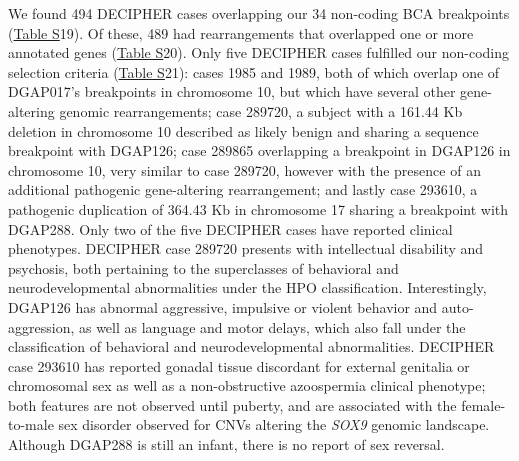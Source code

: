 \documentclass[a4paper,twoside=true,openright,parskip=full,chapterprefix=true,11pt,headings=normal,bibliography=totoc,listof=totoc,titlepage=on,captions=tableabove,draft=false]{scrreprt}
\theoremstyle{definition}
\theoremstyle{definition}
\theoremstyle{definition}
\theoremstyle{remark}
\begin{document}
We found 494 DECIPHER cases overlapping our 34 non-coding BCA
breakpoints (\protect\hyperlink{position-effect-sub-tab}{Table S}19). Of
these, 489 had rearrangements that overlapped one or more annotated
genes (\protect\hyperlink{position-effect-sub-tab}{Table S}20). Only
five DECIPHER cases fulfilled our non-coding selection criteria
(\protect\hyperlink{position-effect-sub-tab}{Table S}21): cases 1985 and
1989, both of which overlap one of DGAP017's breakpoints in chromosome
10, but which have several other gene-altering genomic rearrangements;
case 289720, a subject with a 161.44 Kb deletion in chromosome 10
described as likely benign and sharing a sequence breakpoint with
DGAP126; case 289865 overlapping a breakpoint in DGAP126 in chromosome
10, very similar to case 289720, however with the presence of an
additional pathogenic gene-altering rearrangement; and lastly case
293610, a pathogenic duplication of 364.43 Kb in chromosome 17 sharing a
breakpoint with DGAP288. Only two of the five DECIPHER cases have
reported clinical phenotypes. DECIPHER case 289720 presents with
intellectual disability and psychosis, both pertaining to the
superclasses of behavioral and neurodevelopmental abnormalities under
the HPO classification. Interestingly, DGAP126 has abnormal aggressive,
impulsive or violent behavior and auto-aggression, as well as language
and motor delays, which also fall under the classification of behavioral
and neurodevelopmental abnormalities. DECIPHER case 293610 has reported
gonadal tissue discordant for external genitalia or chromosomal sex as
well as a non-obstructive azoospermia clinical
phenotype;\citep{Vetro2015} both features are not observed until
puberty, and are associated with the female-to-male sex disorder
observed for CNVs altering the \emph{SOX9} genomic landscape. Although
DGAP288 is still an infant, there is no report of sex reversal.
\end{document}
